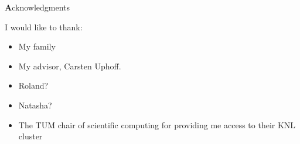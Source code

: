 \clearemptydoublepage
{}
{}

\vspace*{2cm}

\begin{center}
{\Large \textbf Acknowledgments}
\end{center}

\vspace{1cm}

\begin{center}
I would like to thank:

\begin{itemize}
\item My family
\item My advisor, Carsten Uphoff.
\item Roland?
\item Natasha?
\item The TUM chair of scientific computing for providing me access to their KNL cluster
\end{itemize}

\end{center}
